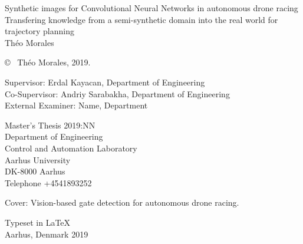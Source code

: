 \newpage
\thispagestyle{plain}
\vspace*{4.5cm}
Synthetic images for Convolutional Neural Networks in autonomous
drone racing\\
Transfering knowledge from a semi-synthetic domain into the real world for
trajectory planning\\
Théo Morales \setlength{\parskip}{1cm}

\copyright ~ Théo Morales, 2019. \setlength{\parskip}{1cm}

Supervisor: Erdal Kayacan, Department of Engineering\\
Co-Supervisor: Andriy Sarabakha, Department of Engineering\\
External Examiner: Name, Department \setlength{\parskip}{1cm}

Master's Thesis 2019:NN\\	%
Department of Engineering\\
Control and Automation Laboratory\\
Aarhus University\\
DK-8000 Aarhus\\
Telephone +4541893252 \setlength{\parskip}{0.5cm}

\vfill
Cover: Vision-based gate detection for autonomous drone racing. \setlength{\parskip}{0.5cm}

Typeset in \LaTeX \\
Aarhus, Denmark 2019


